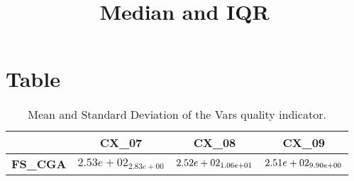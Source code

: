 \documentclass{article}
\title{Median and IQR}
\author{}
\begin{document}
\maketitle
\section{Table}
\begin{table}[!htp]
  \caption{Mean and Standard Deviation of the Vars quality indicator.}
  \label{table:Vars}
  \centering
  \begin{scriptsize}
  \begin{tabular}{c|ccc}
      & \textbf{CX\_07} & \textbf{CX\_08} & \textbf{CX\_09} \\\hline
      \textbf{FS_CGA} & $2.53e+02_{2.83e+00} $ & $ \cellcolor{gray95} 2.52e+02_{1.06e+01} $ & $ \cellcolor{gray25} 2.51e+02_{9.90e+00}$ \\
  \end{tabular}
  \end{scriptsize}
\end{table}
\end{document}
